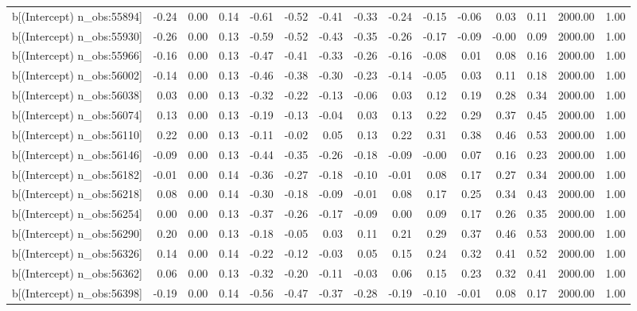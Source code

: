 \begin{table}[ht]
\begin{tabular}{rrrrrrrrrrrrrrr}
  b[(Intercept) n\_obs:55894] & -0.24 & 0.00 & 0.14 & -0.61 & -0.52 & -0.41 & -0.33 & -0.24 & -0.15 & -0.06 & 0.03 & 0.11 & 2000.00 & 1.00 \\ 
  b[(Intercept) n\_obs:55930] & -0.26 & 0.00 & 0.13 & -0.59 & -0.52 & -0.43 & -0.35 & -0.26 & -0.17 & -0.09 & -0.00 & 0.09 & 2000.00 & 1.00 \\ 
  b[(Intercept) n\_obs:55966] & -0.16 & 0.00 & 0.13 & -0.47 & -0.41 & -0.33 & -0.26 & -0.16 & -0.08 & 0.01 & 0.08 & 0.16 & 2000.00 & 1.00 \\ 
  b[(Intercept) n\_obs:56002] & -0.14 & 0.00 & 0.13 & -0.46 & -0.38 & -0.30 & -0.23 & -0.14 & -0.05 & 0.03 & 0.11 & 0.18 & 2000.00 & 1.00 \\ 
  b[(Intercept) n\_obs:56038] & 0.03 & 0.00 & 0.13 & -0.32 & -0.22 & -0.13 & -0.06 & 0.03 & 0.12 & 0.19 & 0.28 & 0.34 & 2000.00 & 1.00 \\ 
  b[(Intercept) n\_obs:56074] & 0.13 & 0.00 & 0.13 & -0.19 & -0.13 & -0.04 & 0.03 & 0.13 & 0.22 & 0.29 & 0.37 & 0.45 & 2000.00 & 1.00 \\ 
  b[(Intercept) n\_obs:56110] & 0.22 & 0.00 & 0.13 & -0.11 & -0.02 & 0.05 & 0.13 & 0.22 & 0.31 & 0.38 & 0.46 & 0.53 & 2000.00 & 1.00 \\ 
  b[(Intercept) n\_obs:56146] & -0.09 & 0.00 & 0.13 & -0.44 & -0.35 & -0.26 & -0.18 & -0.09 & -0.00 & 0.07 & 0.16 & 0.23 & 2000.00 & 1.00 \\ 
  b[(Intercept) n\_obs:56182] & -0.01 & 0.00 & 0.14 & -0.36 & -0.27 & -0.18 & -0.10 & -0.01 & 0.08 & 0.17 & 0.27 & 0.34 & 2000.00 & 1.00 \\ 
  b[(Intercept) n\_obs:56218] & 0.08 & 0.00 & 0.14 & -0.30 & -0.18 & -0.09 & -0.01 & 0.08 & 0.17 & 0.25 & 0.34 & 0.43 & 2000.00 & 1.00 \\ 
  b[(Intercept) n\_obs:56254] & 0.00 & 0.00 & 0.13 & -0.37 & -0.26 & -0.17 & -0.09 & 0.00 & 0.09 & 0.17 & 0.26 & 0.35 & 2000.00 & 1.00 \\ 
  b[(Intercept) n\_obs:56290] & 0.20 & 0.00 & 0.13 & -0.18 & -0.05 & 0.03 & 0.11 & 0.21 & 0.29 & 0.37 & 0.46 & 0.53 & 2000.00 & 1.00 \\ 
  b[(Intercept) n\_obs:56326] & 0.14 & 0.00 & 0.14 & -0.22 & -0.12 & -0.03 & 0.05 & 0.15 & 0.24 & 0.32 & 0.41 & 0.52 & 2000.00 & 1.00 \\ 
  b[(Intercept) n\_obs:56362] & 0.06 & 0.00 & 0.13 & -0.32 & -0.20 & -0.11 & -0.03 & 0.06 & 0.15 & 0.23 & 0.32 & 0.41 & 2000.00 & 1.00 \\ 
  b[(Intercept) n\_obs:56398] & -0.19 & 0.00 & 0.14 & -0.56 & -0.47 & -0.37 & -0.28 & -0.19 & -0.10 & -0.01 & 0.08 & 0.17 & 2000.00 & 1.00 \\ 

\end{tabular}
\end{table}

